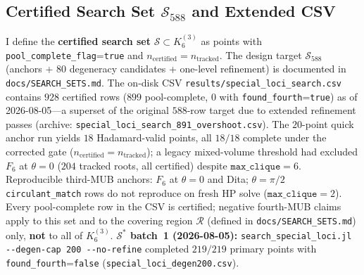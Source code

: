 \documentclass[onecolumn]{IEEEtran}
\newcommand{\repo}[1]{{\ttfamily\nolinkurl{#1}}}
\begin{document}
\subsection{Certified Search Set $\mathcal{S}_{588}$ and Extended CSV}
I define the \textbf{certified search set} $\mathcal{S}\subset K_6^{(3)}$ as points with \texttt{pool\_complete\_flag}=\texttt{true} and $n_{\text{certified}} = n_{\text{tracked}}$.
The design target $\mathcal{S}_{588}$ (anchors + 80 degeneracy candidates + one-level refinement) is documented in \repo{docs/SEARCH_SETS.md}.
The on-disk CSV \repo{results/special_loci_search.csv} contains $928$ certified rows ($899$ pool-complete, $0$ with \texttt{found\_fourth}=\texttt{true}) as of 2026-08-05---a superset of the original $588$-row target due to extended refinement passes (archive: \repo{special_loci_search_891_overshoot.csv}).
The $20$-point quick anchor run yields $18$ Hadamard-valid points, all $18/18$ complete under the corrected gate ($n_{\mathrm{certified}}=n_{\mathrm{tracked}}$); a legacy mixed-volume threshold had excluded $F_6$ at $\theta=0$ ($204$ tracked roots, all certified) despite $\texttt{max\_clique}=6$.
Reproducible third-MUB anchors: $F_6$ at $\theta=0$ and Dita; $\theta=\pi/2$ \texttt{circulant\_match} rows do not reproduce on fresh HP solve ($\texttt{max\_clique}=2$).
Every pool-complete row in the CSV is certified; negative fourth-MUB claims apply to this set and to the covering region $\mathcal{R}$ (defined in \repo{docs/SEARCH_SETS.md}) only, \textbf{not} to all of $K_6^{(3)}$.
\textbf{$\mathcal{S}^*$ batch~1 (2026-08-05):} \repo{search\_special\_loci.jl --degen-cap 200 --no-refine} completed $219/219$ primary points with \texttt{found\_fourth}=\texttt{false} (\repo{special_loci_degen200.csv}).
\end{document}
